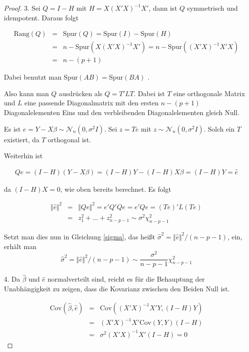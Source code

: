 \documentclass[12pt,a4paper]{article}
\theoremstyle{definition}
\theoremstyle{definition}
\theoremstyle{definition}
\begin{document}
\begin{proof}
3. 
Sei $Q=I-H$ mit $H = X (X'X)^{-1} X'$, dann ist $Q$ symmetrisch und idempotent. Daraus folgt

\begin{eqnarray*}
\text{Rang}(Q) &=& \text{Spur}(Q) = \text{Spur}(I) - \text{Spur}(H) \\
		&=& n - \text{Spur}(X(X'X)^{-1}X') = n - \text{Spur}((X'X)^{-1}X'X) \\
		&=& n - (p+1)
\end{eqnarray*}

Dabei benutzt man $\text{Spur}(AB) = \text{Spur}(BA)$ . 

Also kann man $Q$ ausdrücken als $ Q = T' L T$. Dabei ist $T$ eine orthogonale Matrix und $L$ eine passende Diagonalmatrix mit den ersten $n-(p+1)$ Diagonalelementen Eins und den verbleibenden Diagonalelementen gleich Null.

Es ist $e=Y-X\beta \sim \mathscr{N}_n(0,\sigma^2I)$. Sei $z=Te$ mit $z\sim \mathscr{N}_n(0,\sigma^2I)$. Solch ein $T$ existiert, da $T$ orthogonal ist. 

Weiterhin ist 

\begin{eqnarray*}
Qe = (I-H) (Y-X\beta) = (I-H)Y - (I-H)X \beta = (I-H)Y = \hat{e}
\end{eqnarray*}

da $(I-H)X=0$, wie oben bereits berechnet. Es folgt

\begin{eqnarray*}
\Vert \hat{e} \Vert^2 &=& \Vert Qe \Vert^2 = e'Q'Qe = e'Qe = (Te)' L (Te) \\
&=& z_1^2 + \ldots + z_{n-p-1}^2 \sim \sigma^2 \chi_{n-p-1}^2
\end{eqnarray*}

Setzt man dies nun in Gleichung \eqref{sigma}, das heißt $ \hat{\sigma}^2 = \Vert \hat{e} \Vert^{2} / (n-p-1) $, ein, erhält man 
\[
\hat{\sigma}^2 = \Vert \hat{e} \Vert^{2} / (n-p-1) \sim \frac{\sigma^2}{n-p-1} \chi_{n-p-1}^2
\]

4. Da $\hat{\beta}$ und $\hat{e}$ normalverteilt sind, reicht es für die Behauptung der Unabhängigkeit zu zeigen, dass die Kovarianz zwischen den Beiden Null ist.

\begin{eqnarray*}
\text{Cov}(\hat{\beta},\hat{e}) &=& \text{Cov}((X'X)^{-1} X' Y, (I-H)Y) \\
&=& (X'X)^{-1} X' \text{Cov}(Y,Y) (I-H) \\
&=& \sigma^2 (X'X)^{-1} X' (I-H) = 0
\end{eqnarray*}

\end{proof}
\end{document}
